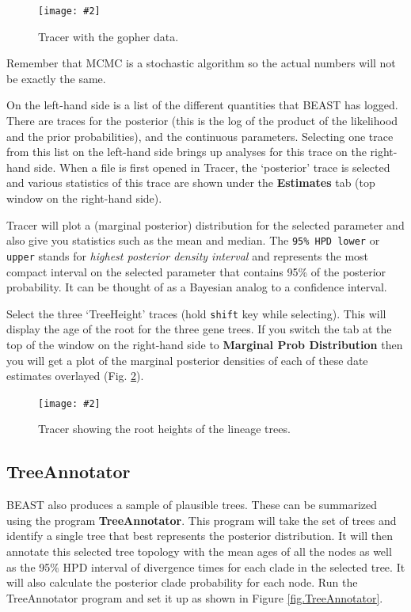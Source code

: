 \documentclass{article}
\newcommand{\includeimage}[2][]{%
\texttt{[image: \#2]}
}
\begin{document}
\begin{figure}[h]
\centering
\includeimage[width=\textwidth]{figures/Tracer1}
\caption{\label{fig.tracer1} Tracer with the gopher data.}
\end{figure}

Remember that MCMC is a stochastic algorithm so the actual numbers will not be exactly the same.

On the left-hand side is a list of the different quantities that BEAST has logged. There are traces for the posterior (this is the log of the product of the likelihood and the prior probabilities), and the continuous parameters. Selecting one trace from this list on the left-hand side brings up analyses for this trace on the right-hand side. When a file is first opened in Tracer, the `posterior' trace is selected and various statistics of this trace are shown under the \textbf{Estimates} tab (top window on the right-hand side). 

Tracer will plot a (marginal posterior) distribution for the selected parameter and also give you statistics such as the mean and median. The \texttt{95\% HPD lower} or \texttt {upper} stands for {\it highest posterior density interval} and represents the most compact interval on the selected parameter that contains 95\% of the posterior probability. It can be thought of as a Bayesian analog to a confidence interval. 

Select the three `TreeHeight' traces (hold \texttt{shift} key while selecting). This will display the
age of the root for the three gene trees. If you switch the tab at the top of the window on the right-hand side to {\bf Marginal Prob Distribution} then you will get a plot of the marginal posterior densities of each of these date estimates overlayed (Fig. \ref{fig.tracer2}).

\begin{figure}[h]
\centering
\includeimage[width=\textwidth]{figures/Tracer2}
\caption{\label{fig.tracer2} Tracer showing the root heights of the lineage trees.}
\end{figure}

\subsection{TreeAnnotator}

BEAST also produces a sample of plausible trees. 
These can be summarized using the program {\bf TreeAnnotator}. This program will take the set of trees and identify a single tree that best represents the posterior distribution. It will then annotate this selected tree topology with the mean ages of all the
nodes as well as the 95\% HPD interval of divergence times for each clade in the selected tree. It will also calculate the posterior clade probability for each
node. Run the TreeAnnotator program and set it up as shown in Figure \ref{fig.TreeAnnotator}.
\end{document}
